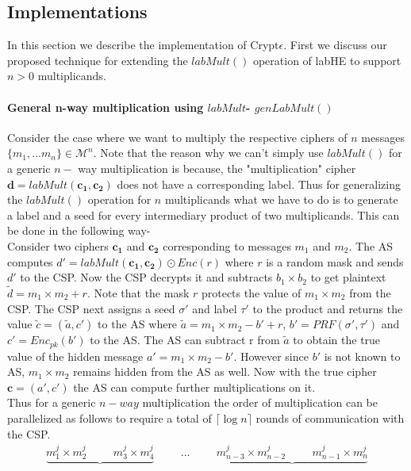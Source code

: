 \subsection{Implementations}\label{implementation}
In this section we describe the implementation of Crypt$\epsilon$. First we discuss our proposed technique for extending the $labMult()$ operation of \textsf{labHE} to support $n > 0$ multiplicands.  
 \paragraph*{General n-way multiplication using $labMult$- $genLabMult()$}
Consider the case where we want to multiply the respective ciphers of  $n$ messages $\{m_1,...m_n\} \in \mathcal{M}^n$. Note that the reason why we can't simply use $labMult()$ for a generic $n-$ way multiplication is because, the "multiplication" cipher $\mathbf{d}=labMult(\mathbf{c_1},\mathbf{c_2})$ does not have  a corresponding label. Thus for generalizing the $labMult()$ operation for $n$ multiplicands what we have to do is to generate a label and a seed for every intermediary product of two multiplicands. This can be done in the following way-  \\
Consider two ciphers $\mathbf{c_1}$ and $\mathbf{c_2}$ corresponding to messages $m_1$ and $m_2$. The \textsf{AS} computes 
$d'=labMult(\mathbf{c_1,c_2}) \odot Enc(r)$ where $r$ is a random mask and sends $d'$ to the \textsf{CSP}. Now the \textsf{CSP} decrypts it and subtracts $b_1\times b_2$ to get plaintext $\tilde{d}=m_1\times m_2+r$. Note that the mask $r$ protects the value of $m_1\times m_2$ from the \textsf{CSP}. The \textsf{CSP} next assigns a seed $\sigma'$ and label $\tau'$ to the product and returns the value $\tilde{c}=(\tilde{a},c')$ to the \textsf{AS} where $\tilde{a}=m_1\times m_2 -b' +r$, $b'=PRF(\sigma',\tau')$ and $c'=Enc_{pk}(b')$ to the \textsf{AS}. The \textsf{AS} can subtract r from $\tilde{a}$ to obtain the  true value of the hidden message $a'=m_1\times m_2 - b'$. However since $b'$ is not known to AS, $m_1\times m_2$ remains hidden from the AS as well. Now with the true cipher $\mathbf{c}=(a',c')$ the AS can compute further multiplications on it. \\
Thus for a generic $n-way$ multiplication the order of multiplication can be parallelized as follows to require a total of $\lceil \log n\rceil$ rounds of communication with the \textsf{CSP}. 
\begin{gather*}
\underbrace{m^j_1\times m^j_2 \hspace{1cm}      m^j_3\times m^j_4}    \hspace{1cm}    ... \hspace{1cm}\underbrace{m^j_{n-3} \times m^j_{n-2} \hspace{1cm}  m^j_{n-1}\times m^j_n}\\
\end{gather*}
